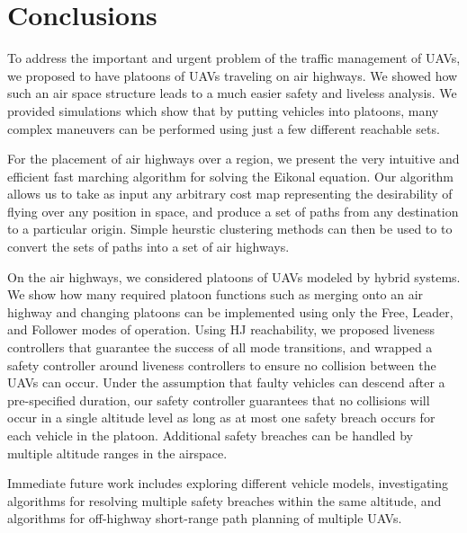 \section{Conclusions}
To address the important and urgent problem of the traffic management of UAVs, we proposed to have platoons of UAVs traveling on air highways. We showed how such an air space structure leads to a much easier safety and liveless analysis. We provided simulations which show that by putting vehicles into platoons, many complex maneuvers can be performed using just a few different reachable sets.

For the placement of air highways over a region, we present the very intuitive and efficient fast marching algorithm for solving the Eikonal equation. Our algorithm allows us to take as input any arbitrary cost map representing the desirability of flying over any position in space, and produce a set of paths from any destination to a particular origin. Simple heurstic clustering methods can then be used to to convert the sets of paths into a set of air highways.

On the air highways, we considered platoons of UAVs modeled by hybrid systems. We show how many required platoon functions such as merging onto an air highway and changing platoons can be implemented using only the Free, Leader, and Follower modes of operation. Using HJ reachability, we proposed liveness controllers that guarantee the success of all mode transitions, and wrapped a safety controller around liveness controllers to ensure no collision between the UAVs can occur. Under the assumption that faulty vehicles can descend after a pre-specified duration, our safety controller guarantees that no collisions will occur in a single altitude level as long as at most one safety breach occurs for each vehicle in the platoon. Additional safety breaches can be handled by multiple altitude ranges in the airspace. 

Immediate future work includes exploring different vehicle models, investigating algorithms for resolving multiple safety breaches within the same altitude, and algorithms for off-highway short-range path planning of multiple UAVs.